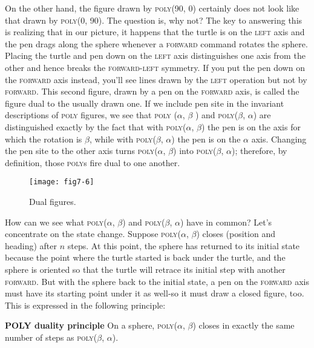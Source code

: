 \documentclass{book}
\begin{document}
On the other hand, the figure drawn by \textsc{poly}(90, 0) certainly does not
look like that drawn by \textsc{poly}(0, 90). The question is, why not? The
key to answering this is realizing that in our picture, it happens that the
turtle is on the \textsc{left} axis and the pen drags along the sphere whenever a
\textsc{forward} command rotates the sphere. Placing the turtle and pen down
on the \textsc{left} axis distinguishes one axis from the other and hence breaks
the \textsc{forward}-\textsc{left} symmetry. If you put the pen down on the \textsc{forward}
axis instead, you'll see lines drawn by the \textsc{left} operation but not by
\textsc{forward}. This second figure, drawn by a pen on the \textsc{forward} axis, is
called the figure dual to the usually drawn one. If we include pen site in
the invariant descriptions of \textsc{poly} figures, we see that \textsc{poly} ($\alpha$, $\beta$ ) and
\textsc{poly}($\beta$, $\alpha$) are distinguished exactly by the fact that with \textsc{poly}($\alpha$, $\beta$)
the pen is on the axis for which the rotation is $\beta$, while with \textsc{poly}($\beta$, $\alpha$)
the pen is on the $\alpha$ axis. Changing the pen site to the other axis turns
\textsc{poly}($\alpha$, $\beta$) into \textsc{poly}($\beta$, $\alpha$); therefore, by definition, those \textsc{poly}s fire
dual to one another.

\begin{figure}
\begin{center}
\texttt{[image: fig7-6]}
\caption{Dual figures.}
\end{center}
\end{figure}

How can we see what \textsc{poly}($\alpha$, $\beta$) and \textsc{poly}($\beta$, $\alpha$) have in common?
Let's concentrate on the state change. Suppose \textsc{poly}($\alpha$, $\beta$) closes 
(position and heading) after $n$ steps. At this point, the sphere has returned to
its initial state because the point where the turtle started is back under
the turtle, and the sphere is oriented so that the turtle will retrace its
initial step with another \textsc{forward}. But with the sphere back to the initial
state, a pen on the \textsc{forward} axis must have its starting point under it
as well-so it must draw a closed figure, too. This is expressed in the
following principle:

\textbf{POLY duality principle} On a sphere, \textsc{poly}($\alpha$, $\beta$) closes in exactly the
same number of steps as \textsc{poly}($\beta$, $\alpha$).
\end{document}
